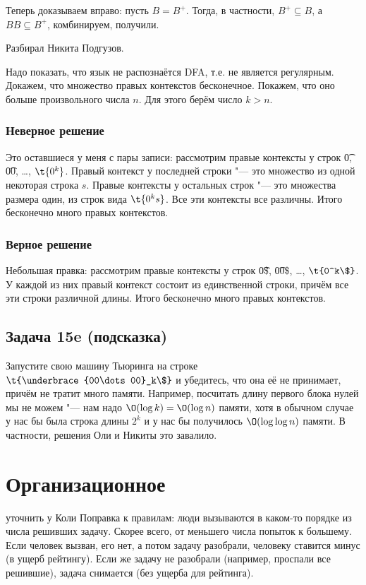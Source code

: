 	Теперь доказываем вправо: пусть $B=B^{+}$.
	Тогда, в частности, $B^{+} \subseteq B$, а $BB \subseteq B^{+}$, комбинируем, получили.

	Разбирал Никита Подгузов.

	Надо показать, что язык не распознаётся DFA, т.е. не является регулярным.
	Докажем, что множество правых контекстов бесконечное.
	Покажем, что оно больше произвольного числа $n$.
	Для этого берём число $k>n$.
	\subsubsection{Неверное решение}
		Это оставшиеся у меня с пары записи:
		рассмотрим правые контексты у строк \t{0}, \t{00}, \dots, $\t{0^k}$.
		Правый контекст у последней строки "--- это множество из одной некоторая строка $s$.
		Правые контексты у остальных строк "--- это множества размера один, из строк вида $\t{0^ks}$.
		Все эти контексты все различны.
		Итого бесконечно много правых контекстов.

	\subsubsection{Верное решение}
		Небольшая правка:
		рассмотрим правые контексты у строк \t{0\$}, \t{00\$}, \dots, $\t{0^k\$}$.
		У каждой из них правый контекст состоит из единственной строки, причём все
		эти строки различной длины.
		Итого бесконечно много правых контекстов.

\subsection{Задача 15e (подсказка)}
	Запустите свою машину Тьюринга на строке $\t{\underbrace{00\dots00}_k\$}$ и убедитесь, что она её не принимает,
	причём не тратит много памяти.
	Например, посчитать длину первого блока нулей мы не можем "--- нам надо $\O(\log k)=\O(\log n)$ памяти,
	хотя в обычном случае у нас бы была строка длины $2^k$ и у нас бы получилось $\O(\log \log n)$ памяти.
	В частности, решения Оли и Никиты это завалило.

\section{Организационное}
	\TODO уточнить у Коли
	Поправка к правилам: люди вызываются в каком-то порядке из числа решивших задачу.
	Скорее всего, от меньшего числа попыток к большему.
	Если человек вызван, его нет, а потом задачу разобрали, человеку ставится минус (в ущерб рейтингу).
	Если же задачу не разобрали (например, проспали все решившие), задача снимается (без ущерба для рейтинга).
